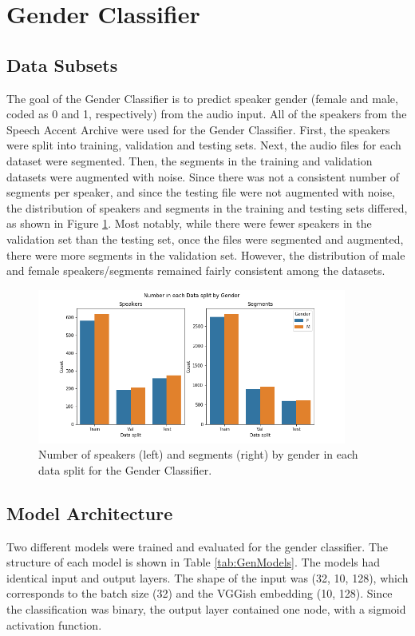\section{Gender Classifier}
\subsection{Data Subsets}

The goal of the Gender Classifier is to predict speaker gender (female and male, coded as 0 and 1, respectively) from the audio input. All of the speakers from the Speech Accent Archive were used for the Gender Classifier. First, the speakers were split into training, validation and testing sets.  Next, the audio files for each dataset were segmented. Then, the segments in the training and validation datasets were augmented with noise. Since there was not a  consistent number of segments per speaker, and since the testing file were not augmented with noise, the distribution of speakers and segments in the training and testing sets differed, as shown in Figure \ref{fig:GenderDist}. Most notably, while there were fewer speakers in the validation set than the testing set, once the files were segmented and augmented, there were more segments in the validation set. However, the distribution of male and female speakers/segments remained fairly consistent among the datasets.

\begin{figure}[h]
\begin{center}
\includegraphics[width=4in]{Gen_NSegSpeakSplit.png}
\caption{Number of speakers (left) and segments (right) by gender in each data split for the Gender Classifier.}
\label{fig:GenderDist}
\end{center}
\end{figure}

\subsection{Model Architecture}
Two different models were trained and evaluated for the gender classifier. The structure of each model is shown in Table \ref{tab:GenModels}. The models had identical input and output layers. The shape of the input was (32, 10, 128), which corresponds to the batch size (32) and the VGGish embedding (10, 128).  Since the classification was binary, the output layer contained one node, with a sigmoid activation function.

